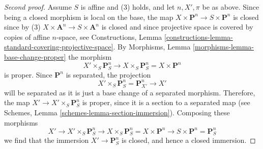 \begin{proof}[Second proof]
\medskip\noindent
Assume $S$ is affine and (3) holds, and let $n, X', \pi$ be as above.
Since being a closed morphism is local on the base, the map
$X \times \mathbf{P}^n \to S \times \mathbf{P}^n$ is closed since by (3)
$X \times \mathbf{A}^n \to S \times \mathbf{A}^n$ is closed and since
projective space is covered by copies of affine $n$-space, see
Constructions,
Lemma \ref{constructions-lemma-standard-covering-projective-space}.
By Morphisms, Lemma \ref{morphisms-lemma-base-change-proper}
the morphism
$$
X' \times_S \mathbf{P}^n_S
\to
X \times_S \mathbf{P}^n_S =
X \times \mathbf{P}^n
$$
is proper. Since $\mathbf{P}^n$ is separated, the projection
$$
X' \times_S \mathbf{P}^n_S = \mathbf{P}^n_{X'} \to X'
$$
will be separated as it is just a base change of a separated
morphism. Therefore, the map $X' \to X' \times_S \mathbf{P}^n_S$ is proper,
since it is a section to a separated map (see
Schemes, Lemma \ref{schemes-lemma-section-immersion}).
Composing these morphisms
$$
X' \to X' \times_S \mathbf{P}^n_S \to X \times_S \mathbf{P}^n_S
= X \times \mathbf{P}^n \to S \times \mathbf{P}^n = \mathbf{P}^n_S
$$
we find that the immersion $X' \to \mathbf{P}^n_S$ is closed, and
hence a closed immersion.
\end{proof}
